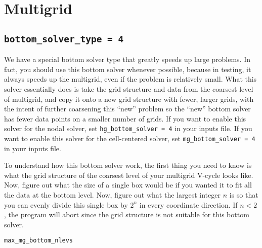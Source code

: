 \section{Multigrid}
\subsection{\tt bottom\_solver\_type = 4}
We have a special bottom solver type that greatly speeds up large problems.
In fact, you should use this bottom solver whenever possible, because in 
testing, it always speeds up the multigrid, even if the problem is relatively 
small.  What this solver essentially does is take the grid structure and
data from the coarsest level of multigrid, and copy it onto a new grid
structure with fewer, larger grids, with the intent of further coarsening
this ``new'' problem so the ``new'' bottom solver has fewer data points on
a smaller number of grids.  If you want to enable this solver for the nodal 
solver, set {\tt hg\_bottom\_solver = 4} in your inputs file.  If you want 
to enable this solver for the cell-centered solver, set 
{\tt mg\_bottom\_solver = 4} in your inputs file.

To understand how this bottom solver work, the first thing you need to know
is what the grid structure of the coarsest level of your multigrid V-cycle
looks like.  Now, figure out what the size of a single box would be if you
wanted it to fit all the data at the bottom level.  Now, figure out what
the largest integer $n$ is so that you can evenly divide this single box
by $2^n$ in every coordinate direction.  If $n < 2$, the program will abort
since the grid structure is not suitable for this bottom solver.

{\tt max\_mg\_bottom\_nlevs}
